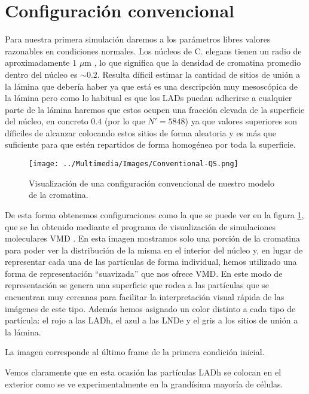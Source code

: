 \section{Configuración convencional}

Para nuestra primera simulación daremos a los parámetros libres valores razonables en condiciones normales. Los núcleos de C. elegans tienen un radio de aproximadamente $1$ $\mu$m \cite{Ikegami2010}, lo que significa que la densidad de cromatina promedio dentro del núcleo es $\sim 0.2$. Resulta díficil estimar la cantidad de sitios de unión a la lámina que debería haber ya que está es una descripción muy mesoscópica de la lámina pero como lo habitual es que los LADs puedan adherirse a cualquier parte de la lámina haremos que estos ocupen una fracción elevada de la superficie del núcleo, en concreto $0.4$ (por lo que $N'=5848$) ya que valores superiores son díficiles de alcanzar colocando estos sitios de forma aleatoria y es más que suficiente para que estén repartidos de forma homogénea por toda la superficie.

\begin{figure}
    \centering
    \texttt{[image: ../Multimedia/Images/Conventional-QS.png]}
    \caption{Visualización de una configuración convencional de nuestro modelo de la cromatina.}
    \label{fig:vmd_QS_image_c}
\end{figure}

De esta forma obtenemos configuraciones como la que se puede ver en la figura \ref{fig:vmd_QS_image_c}, que se ha obtenido mediante el programa de visualización de simulaciones moleculares VMD \cite{Humphrey96}. En esta imagen mostramos solo una porción de la cromatina para poder ver la distribución de la misma en el interior del núcleo y, en lugar de representar cada una de las partículas de forma individual, hemos utilizado una forma de representación ``suavizada'' que nos ofrece VMD. En este modo de representación se genera una superficie que rodea a las partículas que se encuentran muy cercanas para facilitar la interpretación visual rápida de las imágenes de este tipo. Además hemos asignado un color distinto a cada tipo de partícula: el rojo a las LADh, el azul a las LNDe y el gris a los sitios de unión a la lámina.

La imagen corresponde al último frame de la primera condición inicial.

Vemos claramente que en esta ocasión las partículas LADh se colocan en el exterior como se ve experimentalmente en la grandísima mayoría de células.

